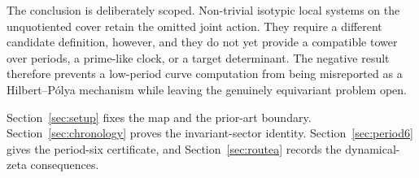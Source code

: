 The conclusion is deliberately scoped.  Non-trivial isotypic local systems on
the unquotiented cover retain the omitted joint action.  They require a different
candidate definition, however, and they do not yet provide a compatible tower
over periods, a prime-like clock, or a target determinant.  The negative result
therefore prevents a low-period curve computation from being misreported as a
Hilbert--P\'olya mechanism while leaving the genuinely equivariant problem
open.

Section~\ref{sec:setup} fixes the map and the prior-art boundary.
Section~\ref{sec:chronology} proves the invariant-sector identity.
Section~\ref{sec:period6} gives the period-six certificate, and
Section~\ref{sec:routea} records the dynamical-zeta consequences.
